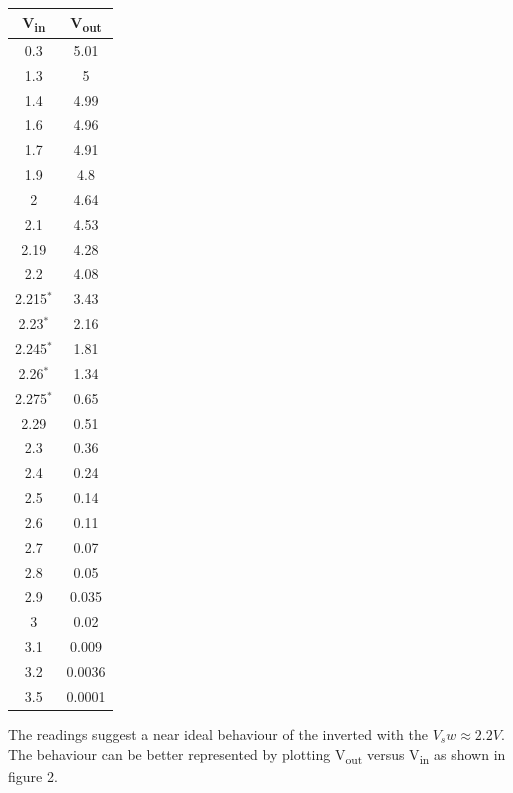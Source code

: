 \documentclass[a4paper, 11pt]{article}
\begin{document}
\begin{center}
\begin{tabular}{| c | c |}
\hline
{\bf V\textsubscript{in}} & {\bf V\textsubscript{out}}\\
\hline
0.3 & 5.01 \\1.3 & 5 \\1.4 & 4.99 \\1.6 & 4.96 \\1.7 & 4.91 \\1.9 & 4.8 \\2 & 4.64 \\2.1 & 4.53 \\2.19 & 4.28 \\2.2 & 4.08 \\2.215$^*$ & 3.43 \\2.23$^*$ & 2.16 \\2.245$^*$ & 1.81 \\2.26$^*$ & 1.34 \\2.275$^*$ & 0.65 \\2.29 & 0.51 \\2.3 & 0.36 \\2.4 & 0.24 \\2.5 & 0.14 \\2.6 & 0.11 \\2.7 & 0.07 \\2.8 & 0.05 \\2.9 & 0.035 \\3 & 0.02 \\3.1 & 0.009 \\3.2 & 0.0036 \\3.5 & 0.0001 \\
\hline
\end{tabular}
\end{center}
The readings suggest a near ideal behaviour of the inverted with the $V_sw \approx 2.2V$. The behaviour can be better represented by plotting V\textsubscript{out} versus V\textsubscript{in} as shown in figure 2.
\let\thefootnote\relax{}
\end{document}
